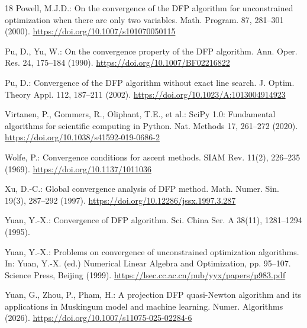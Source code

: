 \documentclass[11pt]{article}
\begin{document}
\begin{thebibliography}{18}
Powell, M.J.D.:
On the convergence of the DFP algorithm for unconstrained optimization when
there are only two variables.
Math. Program. 87, 281--301 (2000).
\url{https://doi.org/10.1007/s101070050115}

Pu, D., Yu, W.:
On the convergence property of the DFP algorithm.
Ann. Oper. Res. 24, 175--184 (1990).
\url{https://doi.org/10.1007/BF02216822}

Pu, D.:
Convergence of the DFP algorithm without exact line search.
J. Optim. Theory Appl. 112, 187--211 (2002).
\url{https://doi.org/10.1023/A:1013004914923}

Virtanen, P., Gommers, R., Oliphant, T.E., et al.:
SciPy 1.0: Fundamental algorithms for scientific computing in Python.
Nat. Methods 17, 261--272 (2020).
\url{https://doi.org/10.1038/s41592-019-0686-2}

Wolfe, P.:
Convergence conditions for ascent methods.
SIAM Rev. 11(2), 226--235 (1969).
\url{https://doi.org/10.1137/1011036}

Xu, D.-C.:
Global convergence analysis of DFP method.
Math. Numer. Sin. 19(3), 287--292 (1997).
\url{https://doi.org/10.12286/jssx.1997.3.287}

Yuan, Y.-X.:
Convergence of DFP algorithm.
Sci. China Ser. A 38(11), 1281--1294 (1995).

Yuan, Y.-X.:
Problems on convergence of unconstrained optimization algorithms.
In: Yuan, Y.-X. (ed.) Numerical Linear Algebra and Optimization,
pp. 95--107. Science Press, Beijing (1999).
\url{https://lsec.cc.ac.cn/pub/yyx/papers/p983.pdf}

Yuan, G., Zhou, P., Pham, H.:
A projection DFP quasi-Newton algorithm and its applications in Muskingum
model and machine learning.
Numer. Algorithms (2026).
\url{https://doi.org/10.1007/s11075-025-02284-6}



\end{thebibliography}
\end{document}
